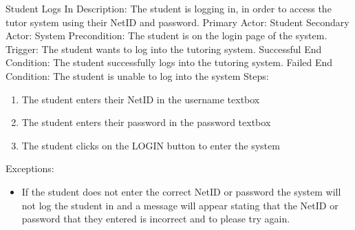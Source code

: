         
    \begin{section}{Student Logs In}
        Description: The student is logging in, in order to access the tutor system using their NetID and password. \newline
        Primary Actor: Student \newline
        Secondary Actor: System \newline
        Precondition: The student is on the login page of the system. \newline
        Trigger: The student wants to log into the tutoring system. \newline
        Successful End Condition: The student successfully logs into the tutoring system. \newline
        Failed End Condition:  The student is unable to log into the system \newline
        \newline
        Steps:
        \begin{enumerate}
            \item{The student enters their NetID in the username textbox}
            \item{The student enters their password in the password textbox}
            \item{The student clicks on the LOGIN button to enter the system}
        \end{enumerate}
        Exceptions:
        \begin{itemize}
            \item{If the student does not enter the correct NetID or password the system will 
            not log the student in and a message will appear stating that the NetID or password 
            that they entered is incorrect and to please try again.}
        \end{itemize}
    \end{section}
    
